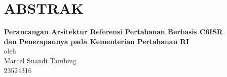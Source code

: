\chapter*{ABSTRAK}

\begin{center}

    \textbf{Perancangan Arsitektur Referensi Pertahanan Berbasis C6ISR\\dan Penerapannya pada Kementerian Pertahanan RI} \\
    \vspace{0.2cm}
    oleh \\
    \vspace{0.2cm}
    Marcel Suandi Tambing\\
    23524316\\
\end{center}



